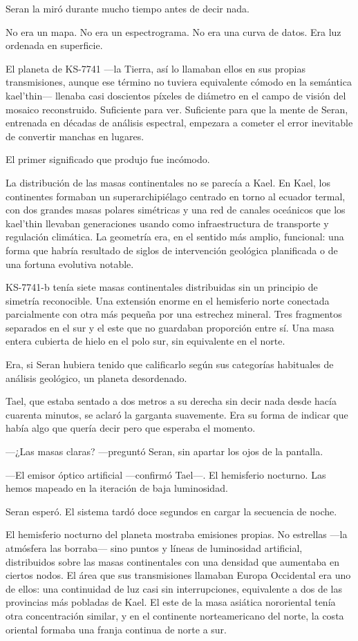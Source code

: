 \documentclass[11pt,a5paper,twoside]{book}
\begin{document}
Seran la miró durante mucho tiempo antes de decir nada.

No era un mapa. No era un espectrograma. No era una curva de datos. Era luz ordenada en superficie.

El planeta de KS-7741 —la Tierra, así lo llamaban ellos en sus propias transmisiones, aunque ese término no tuviera equivalente cómodo en la semántica kael'thin— llenaba casi doscientos píxeles de diámetro en el campo de visión del mosaico reconstruido. Suficiente para ver. Suficiente para que la mente de Seran, entrenada en décadas de análisis espectral, empezara a cometer el error inevitable de convertir manchas en lugares.

El primer significado que produjo fue incómodo.

La distribución de las masas continentales no se parecía a Kael. En Kael, los continentes formaban un superarchipiélago centrado en torno al ecuador termal, con dos grandes masas polares simétricas y una red de canales oceánicos que los kael'thin llevaban generaciones usando como infraestructura de transporte y regulación climática. La geometría era, en el sentido más amplio, funcional: una forma que habría resultado de siglos de intervención geológica planificada o de una fortuna evolutiva notable.

KS-7741-b tenía siete masas continentales distribuidas sin un principio de simetría reconocible. Una extensión enorme en el hemisferio norte conectada parcialmente con otra más pequeña por una estrechez mineral. Tres fragmentos separados en el sur y el este que no guardaban proporción entre sí. Una masa entera cubierta de hielo en el polo sur, sin equivalente en el norte.

Era, si Seran hubiera tenido que calificarlo según sus categorías habituales de análisis geológico, un planeta desordenado.

Tael, que estaba sentado a dos metros a su derecha sin decir nada desde hacía cuarenta minutos, se aclaró la garganta suavemente. Era su forma de indicar que había algo que quería decir pero que esperaba el momento.

—¿Las masas claras? —preguntó Seran, sin apartar los ojos de la pantalla.

—El emisor óptico artificial —confirmó Tael—. El hemisferio nocturno. Las hemos mapeado en la iteración de baja luminosidad.

Seran esperó. El sistema tardó doce segundos en cargar la secuencia de noche.

El hemisferio nocturno del planeta mostraba emisiones propias. No estrellas —la atmósfera las borraba— sino puntos y líneas de luminosidad artificial, distribuidos sobre las masas continentales con una densidad que aumentaba en ciertos nodos. El área que sus transmisiones llamaban Europa Occidental era uno de ellos: una continuidad de luz casi sin interrupciones, equivalente a dos de las provincias más pobladas de Kael. El este de la masa asiática nororiental tenía otra concentración similar, y en el continente norteamericano del norte, la costa oriental formaba una franja continua de norte a sur.
\end{document}
